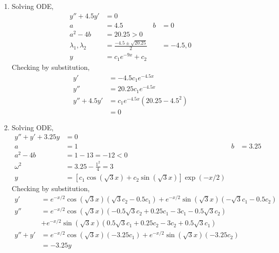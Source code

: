 \begin{enumerate}
    \item Solving ODE,
          \begin{align}
              y'' + 4.5y'              & = 0                                               \\
              a                        & = 4.5                             & b & = 0       \\
              a^{2} - 4b               & = 20.25 > 0                                       \\
              \lambda_{1}, \lambda_{2} & = \frac{-4.5 \pm \sqrt{20.25}}{2} &   & = -4.5, 0 \\
              y                        & = c_{1}e^{-9x} + c_{2}
          \end{align}
          Checking by substitution,
          \begin{align}
              y'          & = -4.5c_{1}e^{-4.5x}              \\
              y''         & = 20.25c_{1}e^{-4.5x}             \\
              y'' + 4.5y' & = c_{1}e^{-4.5x}(20.25 - 4.5^{2}) \\
                          & = 0
          \end{align}

    \item Solving ODE,
          \begin{align}
              y'' + y' + 3.25y & = 0                                                                       \\
              a                & = 1                                                          & b & = 3.25 \\
              a^{2} - 4b       & = 1 - 13 = -12 < 0                                                        \\
              \omega^{2}       & = 3.25 - \frac{1^{2}}{4} = 3                                              \\
              y                & = [c_{1}\cos(\sqrt{3} x) + c_{2}\sin(\sqrt{3} x)] \exp(-x/2)
          \end{align}
          Checking by substitution,
          \begin{align}
              y'       & = e^{-x/2}\cos(\sqrt{3} x) (\sqrt{3} c_{2} - 0.5c_{1}) + e^{-x/2}\sin(\sqrt{3} x)(-\sqrt{3} c_{1} - 0.5c_{2}) \\
              y''      & = e^{-x/2}\cos(\sqrt{3} x)(-0.5\sqrt{3} c_{2} + 0.25c_{1} - 3c_{1} - 0.5\sqrt{3} c_{2})                       \\
                       & + e^{-x/2}\sin(\sqrt{3} x)(0.5\sqrt{3} c_{1} + 0.25c_{2} - 3c_{2} + 0.5\sqrt{3} c_{1})                        \\
              y'' + y' & = e^{-x/2}\cos(\sqrt{3} x)(-3.25c_{1}) + e^{-x/2}\sin(\sqrt{3}x)(-3.25c_{2})                                  \\
                       & = -3.25y
          \end{align}


\end{enumerate}
